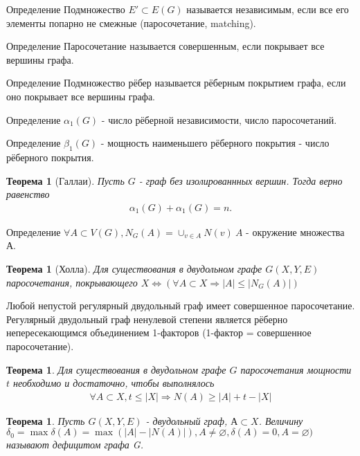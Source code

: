 \documentclass[a4paper,openany]{book}
\newcounter{TheoremCounter}
\newtheorem{theorem}[TheoremCounter]{Теорема}
\newenvironment{definition}
{\begin{statement}{Определение}}
    {\end{statement}}
\newenvironment{consequence}{}{}
\renewcommand{\emptyset}{\varnothing}
\begin{document}
\begin{definition}
  Подмножество $E' \subset E(G)$ называется независимым, если все его элементы
  попарно не смежные (паросочетание, matching).
\end{definition}

\begin{definition}
  Паросочетание называется совершенным, если  покрывает все вершины графа.
\end{definition}

\begin{definition}
  Подмножество рёбер называется рёберным покрытием графа, если оно покрывает все вершины графа.
\end{definition}

\begin{definition}
  $\alpha_1(G)$ - число рёберной независимости, число паросочетаний.
\end{definition}

\begin{definition}
  $\beta_1(G)$ - мощность наименьшего рёберного покрытия - число рёберного покрытия.
\end{definition}

\begin{theorem}[Галлаи]
  Пусть $G$ - граф без изолированнных вершин. Тогда верно равенство
  \begin{align*}
    \alpha_1(G) + \alpha_1(G) = n.
  \end{align*}
\end{theorem}

\begin{definition}
  $\forall A \subset V(G), N_G(A) = \cup_{v \in A}N(v) \ A$ - окружение множества А.
\end{definition}
\begin{theorem}[Холла]
  Для существования в двудольном графе $G(X, Y, E)$ паросочетания, покрывающего
  $X \Leftrightarrow (\forall A \subset X \Rightarrow |A| \leqslant |N_G(A)|)$
\end{theorem}
\begin{consequence}
  Любой непустой регулярный двудольный граф имеет совершенное паросочетание.
\end{consequence}
\begin{consequence}
  Регулярный двудольный граф ненулевой степени является рёберно непересекающимся
  объединением 1-факторов (1-фактор = совершенное паросочетание).
\end{consequence}

\begin{theorem}
  Для существования в двудольном графе $G$ паросочетания мощности $t$ необходимо
  и достаточно, чтобы выполнялось
  \begin{align*}
    \forall A \subset X, t \leqslant |X| \Rightarrow N(A) \geqslant |A| + t - |X|
  \end{align*}
\end{theorem}
\begin{theorem}
  Пусть $G(X,Y,E)$ - двудольный граф, $А \subset X$. Величину $\delta_0 = \max\delta(A) = \max(|A|-|N(A)|), A \neq \emptyset, \delta(A)=0, A = \emptyset)$  называют дефицитом графа G.
\end{theorem}
\end{document}
